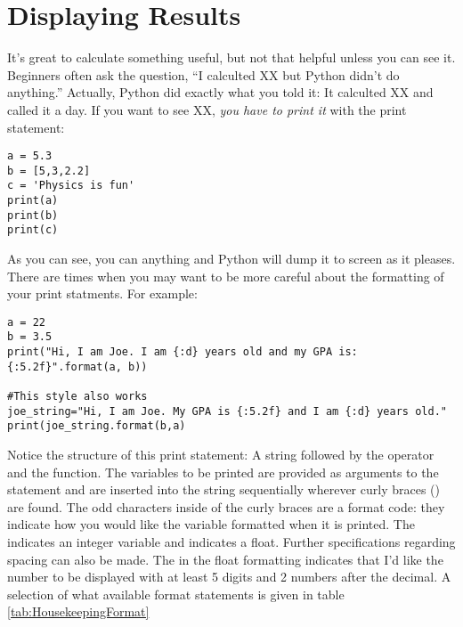 \section{Displaying Results}
It's great to calculate something useful, but not that helpful unless
you can see it.  Beginners often ask the question, ``I calculted XX
but Python didn't do anything.''  Actually, Python did exactly what
you told it:  It calculted XX and called it a day.  If you want to see
XX, {\em you have to print it} with the print statement:
\begin{Verbatim}
a = 5.3
b = [5,3,2.2]
c = 'Physics is fun'
print(a)
print(b)
print(c)
\end{Verbatim}
 As you can see, you can  anything and Python will dump
it to screen as it pleases.  There are times when you may want to be
more careful about the formatting of your print statments.  For
example:
\begin{Verbatim}
a = 22
b = 3.5
print("Hi, I am Joe. I am {:d} years old and my GPA is:
{:5.2f}".format(a, b))

#This style also works
joe_string="Hi, I am Joe. My GPA is {:5.2f} and I am {:d} years old."
print(joe_string.format(b,a)

\end{Verbatim}
Notice the structure of this print statement: A string followed by the
 operator and the  function. The variables to
be printed are provided as arguments to the  statement
and are inserted into the string sequentially wherever curly braces
(\code{\{\}}) are found.  The odd characters inside of the curly
braces are a format code: they indicate how you would like the
variable formatted when it is printed. The 
indicates an integer variable and  indicates a float.
Further specifications regarding spacing can also be made.  The
 in the float formatting indicates that I'd like the number
to be displayed with at least 5 digits and 2 numbers after the
decimal.  A selection of what available format statements is given in table
\ref{tab:HousekeepingFormat}



